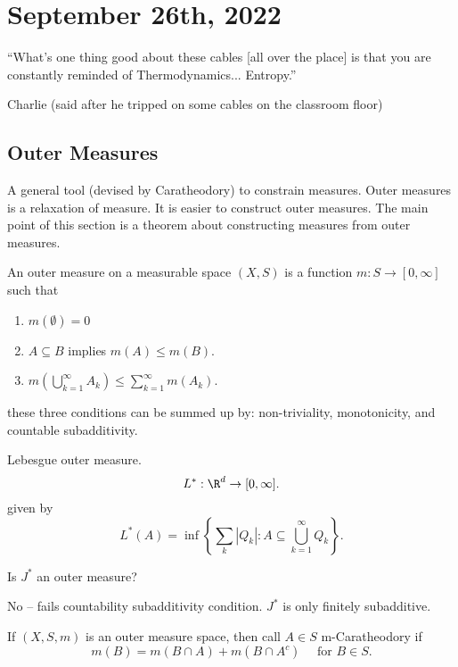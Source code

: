 \section{September 26th, 2022}

\epigraph{``What's one thing good about these cables [all over the place] is that you are constantly reminded
	of Thermodynamics... Entropy.''}{Charlie (said after he tripped on some cables on the classroom floor)}

\subsection{Outer Measures}
A general tool (devised by Caratheodory) to constrain measures. Outer measures is a relaxation of measure.
It is easier to construct outer measures. The main point of this section is a theorem about
constructing measures from outer measures.

\begin{definition}
	An outer measure on a measurable space $(X,S)$ is a function $m: S \to [0, \infty]$ such that
	\begin{enumerate}
		\item $m(\emptyset) = 0$
		\item $A \subseteq B$ implies $m(A) \leq m(B)$.
		\item $m \left(\bigcup_{k=1}^{\infty} A_k\right) \leq \sum_{k = 1}^{\infty} m(A_k)$.
	\end{enumerate}
	these three conditions can be summed up by: non-triviality, monotonicity, and countable subadditivity.
\end{definition}

\begin{example}
  Lebesgue outer measure.
	\[
		L^* : \R^d \to [0, \infty].
	\]
	given by
	\[
		L^*(A) = \inf \left\{\sum_k \left|Q_k\right| : A \subseteq \bigcup_{k = 1}^{\infty} Q_k \right\}.
	\]
\end{example}

\begin{question}
Is $J^*$ an outer measure?
\end{question}
No -- fails countability subadditivity condition. $J^*$ is only finitely subadditive.

\begin{definition}[m-Caratheodory]
	If $(X,S,m)$ is an outer measure space, then call $A \in S$ m-Caratheodory if
	\[
		m(B) = m(B \cap A) + m(B \cap A^c) \quad \text{ for } B \in S.
	\]
\end{definition}

